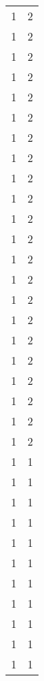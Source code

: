 \begin{tabular}{rr}
                  1 &             2 \\
                  1 &             2 \\
                  1 &             2 \\
                  1 &             2 \\
                  1 &             2 \\
                  1 &             2 \\
                  1 &             2 \\
                  1 &             2 \\
                  1 &             2 \\
                  1 &             2 \\
                  1 &             2 \\
                  1 &             2 \\
                  1 &             2 \\
                  1 &             2 \\
                  1 &             2 \\
                  1 &             2 \\
                  1 &             2 \\
                  1 &             2 \\
                  1 &             2 \\
                  1 &             2 \\
                  1 &             2 \\
                  1 &             2 \\
                  1 &             1 \\
                  1 &             1 \\
                  1 &             1 \\
                  1 &             1 \\
                  1 &             1 \\
                  1 &             1 \\
                  1 &             1 \\
                  1 &             1 \\
                  1 &             1 \\
                  1 &             1 \\
                  1 &             1 \\

\end{tabular}
